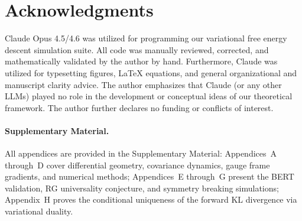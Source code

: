 \documentclass[twoside,11pt]{article}
\begin{document}
\section*{Acknowledgments}
Claude Opus 4.5/4.6 was utilized for programming our variational free energy descent simulation suite. All code was manually reviewed, corrected, and mathematically validated by the author by hand. Furthermore, Claude was utilized for typesetting figures, LaTeX equations, and general organizational and manuscript clarity advice. The author emphasizes that Claude (or any other LLMs) played no role in the development or conceptual ideas of our theoretical framework. The author further declares no funding or conflicts of interest.

\paragraph{Supplementary Material.} All appendices are provided in the Supplementary Material: Appendices~A through~D cover differential geometry, covariance dynamics, gauge frame gradients, and numerical methods; Appendices~E through~G present the BERT validation, RG universality conjecture, and symmetry breaking simulations; Appendix~H proves the conditional uniqueness of the forward KL divergence via variational duality.


\end{document}
